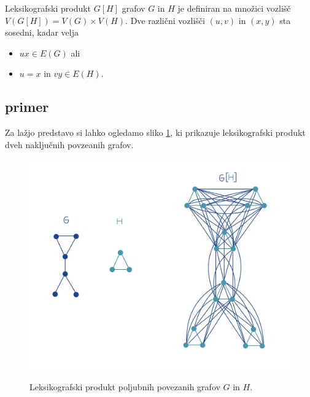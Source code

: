 \documentclass[mat1, tisk]{fmfdelo}
\begin{document}
\begin{definicija}
    Leksikografski produkt $G[H]$ grafov $G$ in $H$ je definiran na množici vozlišč 
    $V (G[H]) = V (G)\times V (H)$. Dve različni vozlišči $(u, v)$ in $(x, y)$ sta 
    sosedni, kadar velja
\begin{itemize}
    \item $ux \in E(G)$ ali
    \item $u = x$ in $vy \in E(H).$ 
\end{itemize}
\end{definicija}




\subsection{primer}
Za lažjo predstavo si lahko ogledamo sliko \ref{fig:produkt}, ki prikazuje leksikografski produkt
dveh naključnih povzeanih grafov.

\begin{figure}[h]
    \caption{Leksikografski produkt poljubnih povezanih grafov $G$ in $H$.}
    \centering
    \includegraphics[width=\textwidth]{IMG_produkt.jpg}   
    \label{fig:produkt}   
\end{figure}


\end{document}
